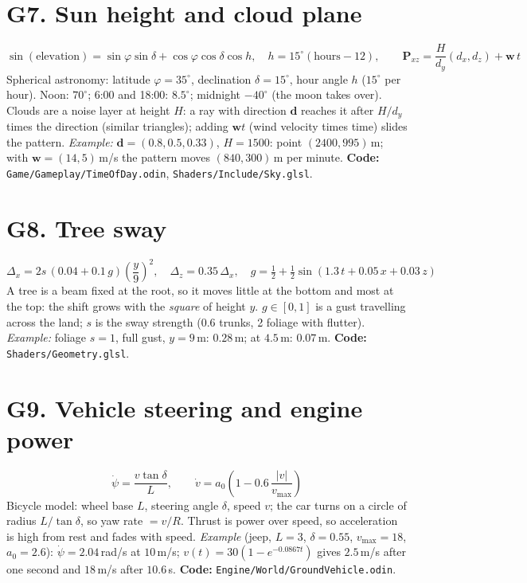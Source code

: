 \documentclass[11pt,a4paper]{article}
\newcommand{\code}[1]{{\small\texttt{#1}}}
\begin{document}
\section{G7. Sun height and cloud plane}
\[\sin(\text{elevation})=\sin\varphi\sin\delta+\cos\varphi\cos\delta\cos h,\quad h=15^{\circ}(\text{hours}-12),\qquad \mathbf P_{xz}=\frac{H}{d_y}(d_x,d_z)+\mathbf w\,t\]
Spherical astronomy: latitude $\varphi=35^{\circ}$, declination $\delta=15^{\circ}$, hour angle $h$ ($15^{\circ}$ per hour). Noon: $70^{\circ}$; 6:00 and 18:00: $8.5^{\circ}$; midnight $-40^{\circ}$ (the moon takes over). Clouds are a noise layer at height $H$: a ray with direction $\mathbf d$ reaches it after $H/d_y$ times the direction (similar triangles); adding $\mathbf wt$ (wind velocity times time) slides the pattern. \emph{Example:} $\mathbf d=(0.8,0.5,0.33)$, $H=1500$: point $(2400,995)$\,m; with $\mathbf w=(14,5)$\,m/s the pattern moves $(840,300)$\,m per minute. \textbf{Code:} \code{Game/Gameplay/TimeOfDay.odin}, \code{Shaders/Include/Sky.glsl}.

\section{G8. Tree sway}
\[\Delta_x=2s\,(0.04+0.1\,g)\left(\frac{y}{9}\right)^{2},\quad \Delta_z=0.35\,\Delta_x,\quad g=\tfrac12+\tfrac12\sin(1.3\,t+0.05\,x+0.03\,z)\]
A tree is a beam fixed at the root, so it moves little at the bottom and most at the top: the shift grows with the \emph{square} of height $y$. $g\in[0,1]$ is a gust travelling across the land; $s$ is the sway strength (0.6 trunks, 2 foliage with flutter). \emph{Example:} foliage $s=1$, full gust, $y=9$\,m: $0.28$\,m; at $4.5$\,m: $0.07$\,m. \textbf{Code:} \code{Shaders/Geometry.glsl}.

\section{G9. Vehicle steering and engine power}
\[\dot\psi=\frac{v\tan\delta}{L},\qquad \dot v=a_0\left(1-0.6\,\frac{|v|}{v_{\max}}\right)\]
Bicycle model: wheel base $L$, steering angle $\delta$, speed $v$; the car turns on a circle of radius $L/\tan\delta$, so yaw rate $=v/R$. Thrust is power over speed, so acceleration is high from rest and fades with speed. \emph{Example} (jeep, $L=3$, $\delta=0.55$, $v_{\max}=18$, $a_0=2.6$): $\dot\psi=2.04$\,rad/s at $10$\,m/s; $v(t)=30(1-e^{-0.0867t})$ gives $2.5$\,m/s after one second and $18$\,m/s after $10.6$\,s. \textbf{Code:} \code{Engine/World/GroundVehicle.odin}.
\end{document}
